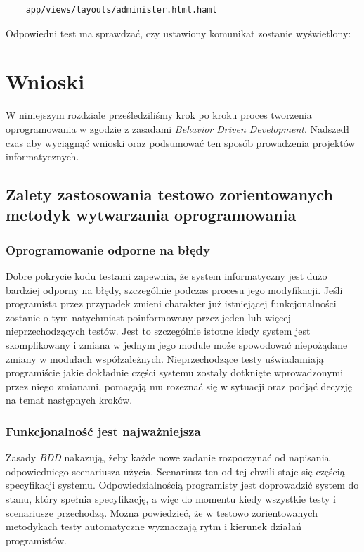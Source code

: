  	\begin{lstlisting}
 	app/views/layouts/administer.html.haml
 	\end{lstlisting}
 	
 	Odpowiedni test ma sprawdzać, czy ustawiony komunikat zostanie wyświetlony:
 	
 	
  
  \section{Wnioski}
  
  W niniejszym rozdziale prześledziliśmy krok po kroku proces tworzenia oprogramowania w zgodzie z zasadami \emph{Behavior Driven Development}. Nadszedł czas aby wyciągnąć wnioski oraz podsumować ten sposób prowadzenia projektów informatycznych.
  
  \subsection{Zalety zastosowania testowo zorientowanych metodyk wytwarzania oprogramowania}
  
  \subsubsection{Oprogramowanie odporne na błędy}
    Dobre pokrycie kodu testami zapewnia, że system informatyczny jest dużo bardziej odporny na błędy, szczególnie podczas procesu jego modyfikacji. Jeśli programista przez przypadek zmieni charakter już istniejącej funkcjonalności zostanie o tym natychmiast poinformowany przez jeden lub więcej nieprzechodzących testów. Jest to szczególnie istotne kiedy system jest skomplikowany i zmiana w jednym jego module może spowodować niepożądane zmiany w modułach współzależnych. Nieprzechodzące testy uświadamiają programiście jakie dokładnie części systemu zostały dotknięte wprowadzonymi przez niego zmianami, pomagają mu rozeznać się w sytuacji oraz podjąć decyzję na temat następnych kroków.
    
  \subsubsection{Funkcjonalność jest najważniejsza}
  Zasady \emph{BDD} nakazują, żeby każde nowe zadanie rozpoczynać od napisania odpowiedniego scenariusza użycia. Scenariusz ten od tej chwili staje się częścią specyfikacji systemu. Odpowiedzialnością programisty jest doprowadzić system do stanu, który spełnia specyfikację, a więc do momentu kiedy wszystkie testy i scenariusze przechodzą. Można powiedzieć, że w testowo zorientowanych metodykach testy automatyczne wyznaczają rytm i kierunek działań programistów. 
    
